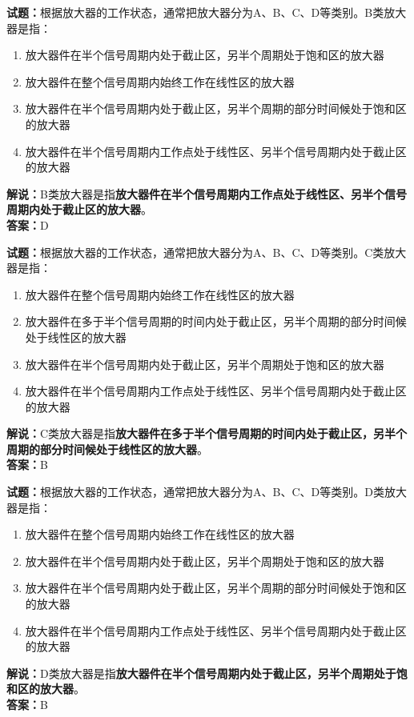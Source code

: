 \documentclass{ctexbook}
\begin{document}
\vspace{1em}

\textbf{试题：}根据放大器的工作状态，通常把放大器分为A、B、C、D等类别。B类放大器是指：
\begin{enumerate}[leftmargin=3em]
  \item 放大器件在半个信号周期内处于截止区，另半个周期处于饱和区的放大器
  \item 放大器件在整个信号周期内始终工作在线性区的放大器
  \item 放大器件在半个信号周期内处于截止区，另半个周期的部分时间候处于饱和区的放大器
  \item 放大器件在半个信号周期内工作点处于线性区、另半个信号周期内处于截止区的放大器
\end{enumerate}
\noindent\textbf{解说：}B类放大器是指\textbf{放大器件在半个信号周期内工作点处于线性区、另半个信号周期内处于截止区的放大器}。\\\noindent\textbf{答案：}D

\vspace{1em}

\textbf{试题：}根据放大器的工作状态，通常把放大器分为A、B、C、D等类别。C类放大器是指：
\begin{enumerate}[leftmargin=3em]
  \item 放大器件在整个信号周期内始终工作在线性区的放大器
  \item 放大器件在多于半个信号周期的时间内处于截止区，另半个周期的部分时间候处于线性区的放大器
  \item 放大器件在半个信号周期内处于截止区，另半个周期处于饱和区的放大器
  \item 放大器件在半个信号周期内工作点处于线性区、另半个信号周期内处于截止区的放大器
\end{enumerate}
\noindent\textbf{解说：}C类放大器是指\textbf{放大器件在多于半个信号周期的时间内处于截止区，另半个周期的部分时间候处于线性区的放大器}。\\\noindent\textbf{答案：}B

\vspace{1em}

\textbf{试题：}根据放大器的工作状态，通常把放大器分为A、B、C、D等类别。D类放大器是指：
\begin{enumerate}[leftmargin=3em]
  \item 放大器件在整个信号周期内始终工作在线性区的放大器
  \item 放大器件在半个信号周期内处于截止区，另半个周期处于饱和区的放大器
  \item 放大器件在半个信号周期内处于截止区，另半个周期的部分时间候处于饱和区的放大器
  \item 放大器件在半个信号周期内工作点处于线性区、另半个信号周期内处于截止区的放大器
\end{enumerate}
\noindent\textbf{解说：}D类放大器是指\textbf{放大器件在半个信号周期内处于截止区，另半个周期处于饱和区的放大器}。\\\noindent\textbf{答案：}B
\end{document}
